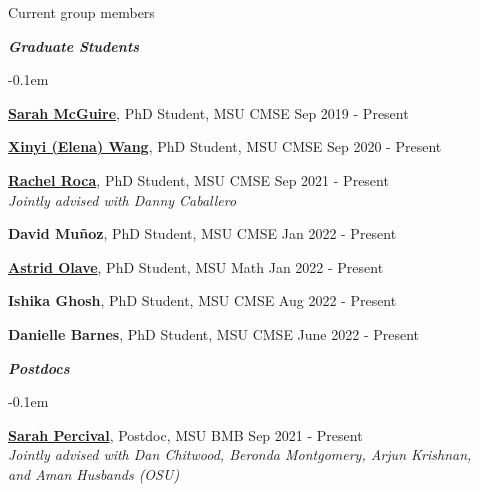 \documentclass{resume} %
\begin{document}
\newpage
\begin{rSection}{Current group members}


\textbf{\textit{Graduate Students}}
\begin{list}{}{\leftmargin=1em}
   \itemsep -0.1em %





   \item \textbf{\href{https://www.sarah-mcguire.com/}{Sarah McGuire}}, PhD Student, MSU CMSE \hfill Sep 2019 - Present


   \item \textbf{\href{https://elenaxwang.com/}{Xinyi (Elena) Wang}}, PhD Student, MSU CMSE \hfill Sep 2020 - Present


   \item \textbf{\href{https://sites.google.com/manhattan.edu/racheleroca/home}{Rachel Roca}}, PhD Student, MSU CMSE \hfill Sep 2021 - Present
\\
   \phantom{XXX} \textit{Jointly advised with Danny Caballero}


   \item \textbf{David Muñoz}, PhD Student, MSU CMSE \hfill Jan 2022 - Present
   

   \item \textbf{\href{https://aaolaveh.github.io/}{Astrid Olave}}, PhD Student, MSU Math \hfill Jan 2022 - Present
   

   
   \item \textbf{Ishika Ghosh}, PhD Student, MSU CMSE \hfill Aug 2022 - Present
   
   \item \textbf{Danielle Barnes}, PhD Student, MSU CMSE \hfill June 2022 - Present




\end{list}


\textbf{\textit{Postdocs}}
\begin{list}{}{\leftmargin=1em}
   \itemsep -0.1em %



   \item \textbf{\href{https://sperciva.github.io/}{Sarah Percival}}, Postdoc, MSU BMB \hfill Sep 2021 - Present\\
   \phantom{XXX} \textit{Jointly advised with Dan Chitwood, Beronda Montgomery, Arjun Krishnan,}\\
   \phantom{XXX} \textit{and Aman Husbands (OSU)}



\end{list}
\end{rSection}
\end{document}
